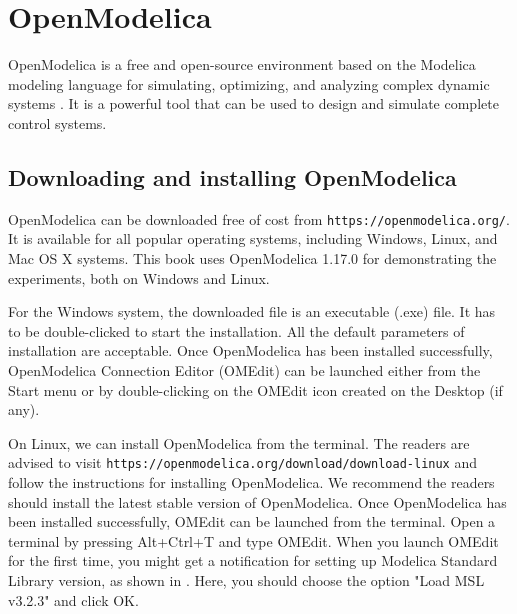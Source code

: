 \begin{juliacode}
      \label{julia:test-firmware}
      
\end{juliacode}






\section{OpenModelica}
\label{sec:OpenModelica-start}
OpenModelica is a free and open-source environment based on the Modelica modeling language 
for simulating, optimizing, and analyzing complex dynamic systems \cite{om-ref}.
It is a powerful tool that can be used to design and simulate complete control systems. 


\subsection{Downloading and installing OpenModelica} \label{OpenModelica-installation}
OpenModelica can be downloaded free of cost from {\tt https://openmodelica.org/}. 
It is available for all popular operating systems, including Windows, Linux, 
and Mac OS X systems. This book uses OpenModelica 1.17.0 for demonstrating the experiments, both on
Windows and Linux.

For the Windows system, the downloaded file is an executable (.exe) file. It has to
be double-clicked to start the installation. All the default parameters of installation
are acceptable. Once OpenModelica has been installed successfully, OpenModelica 
Connection Editor (OMEdit) can be launched either from the Start menu or by double-clicking on the OMEdit icon created on the Desktop (if any).

On Linux, we can install OpenModelica from the terminal. The readers are advised to visit 
      {\tt https://openmodelica.org/download/download-linux} and follow the instructions for installing OpenModelica.
We recommend the readers should install the latest stable version of OpenModelica. 
Once OpenModelica has been installed successfully, OMEdit can be launched
from the terminal. Open a terminal by pressing Alt+Ctrl+T and type OMEdit. When you 
launch OMEdit for the first time, you might get a notification for setting up 
Modelica Standard Library version, as shown in . Here, you 
should choose the option "Load MSL v3.2.3" and click OK.  

